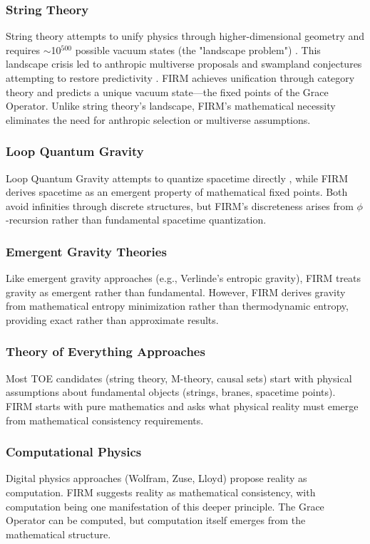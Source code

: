 \documentclass[12pt]{article}
\begin{document}
\subsubsection{String Theory}
String theory attempts to unify physics through higher-dimensional geometry and requires $\sim$10$^{500}$ possible vacuum states (the "landscape problem") \citep{Polchinski1998, Susskind2003}. This landscape crisis led to anthropic multiverse proposals \citep{Susskind2003} and swampland conjectures attempting to restore predictivity \citep{Ooguri2019}. FIRM achieves unification through category theory and predicts a unique vacuum state—the fixed points of the Grace Operator. Unlike string theory's landscape, FIRM's mathematical necessity eliminates the need for anthropic selection or multiverse assumptions.

\subsubsection{Loop Quantum Gravity}
Loop Quantum Gravity attempts to quantize spacetime directly \citep{Rovelli2004, Thiemann2007}, while FIRM derives spacetime as an emergent property of mathematical fixed points. Both avoid infinities through discrete structures, but FIRM's discreteness arises from $\phi$-recursion rather than fundamental spacetime quantization.

\subsubsection{Emergent Gravity Theories}
Like emergent gravity approaches (e.g., Verlinde's entropic gravity), FIRM treats gravity as emergent rather than fundamental. However, FIRM derives gravity from mathematical entropy minimization rather than thermodynamic entropy, providing exact rather than approximate results.

\subsubsection{Theory of Everything Approaches}
Most TOE candidates (string theory, M-theory, causal sets) start with physical assumptions about fundamental objects (strings, branes, spacetime points). FIRM starts with pure mathematics and asks what physical reality must emerge from mathematical consistency requirements.

\subsubsection{Computational Physics}
Digital physics approaches (Wolfram, Zuse, Lloyd) propose reality as computation. FIRM suggests reality as mathematical consistency, with computation being one manifestation of this deeper principle. The Grace Operator can be computed, but computation itself emerges from the mathematical structure.
\end{document}
